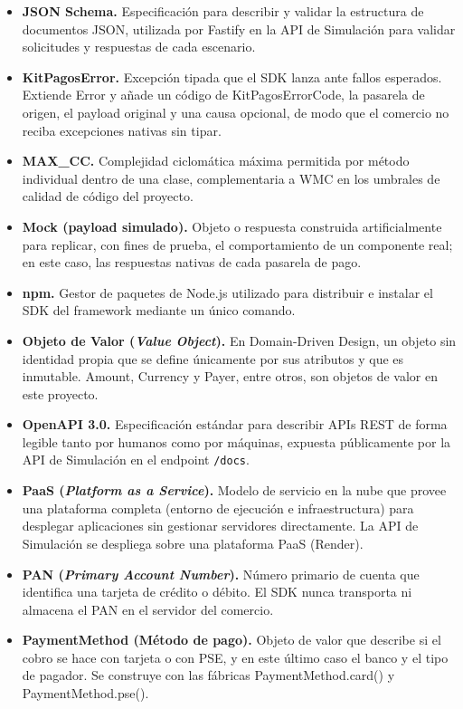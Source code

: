 \begin{itemize}
    \item \textbf{JSON Schema.} Especificación para describir y validar la estructura de documentos JSON, utilizada por Fastify en la API de Simulación para validar solicitudes y respuestas de cada escenario.
    \item \textbf{KitPagosError.} Excepción tipada que el SDK lanza ante fallos esperados. Extiende Error y añade un código de KitPagosErrorCode, la pasarela de origen, el payload original y una causa opcional, de modo que el comercio no reciba excepciones nativas sin tipar.
    \item \textbf{MAX\_CC.} Complejidad ciclomática máxima permitida por método individual dentro de una clase, complementaria a WMC en los umbrales de calidad de código del proyecto.
    \item \textbf{Mock (payload simulado).} Objeto o respuesta construida artificialmente para replicar, con fines de prueba, el comportamiento de un componente real; en este caso, las respuestas nativas de cada pasarela de pago.
    \item \textbf{npm.} Gestor de paquetes de Node.js utilizado para distribuir e instalar el SDK del framework mediante un único comando.
    \item \textbf{Objeto de Valor (\textit{Value Object}).} En Domain-Driven Design, un objeto sin identidad propia que se define únicamente por sus atributos y que es inmutable. Amount, Currency y Payer, entre otros, son objetos de valor en este proyecto.
    \item \textbf{OpenAPI 3.0.} Especificación estándar para describir APIs REST de forma legible tanto por humanos como por máquinas, expuesta públicamente por la API de Simulación en el endpoint \texttt{/docs}.
    \item \textbf{PaaS (\textit{Platform as a Service}).} Modelo de servicio en la nube que provee una plataforma completa (entorno de ejecución e infraestructura) para desplegar aplicaciones sin gestionar servidores directamente. La API de Simulación se despliega sobre una plataforma PaaS (Render).
    \item \textbf{PAN (\textit{Primary Account Number}).} Número primario de cuenta que identifica una tarjeta de crédito o débito. El SDK nunca transporta ni almacena el PAN en el servidor del comercio.
    \item \textbf{PaymentMethod (Método de pago).} Objeto de valor que describe si el cobro se hace con tarjeta o con PSE, y en este último caso el banco y el tipo de pagador. Se construye con las fábricas PaymentMethod.card() y PaymentMethod.pse().

\end{itemize}
